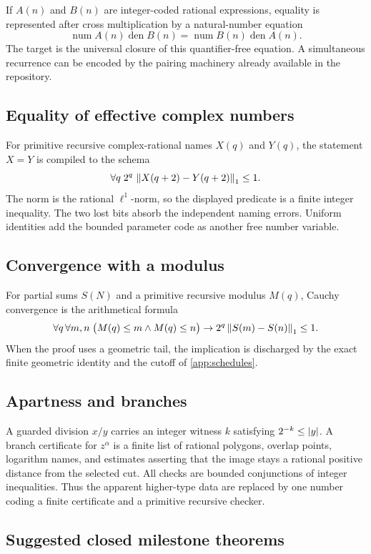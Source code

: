 If \(A(n)\) and \(B(n)\) are integer-coded rational expressions, equality is
represented after cross multiplication by a natural-number equation
\[
 \operatorname{num}A(n)\operatorname{den}B(n)
 =\operatorname{num}B(n)\operatorname{den}A(n).
\]
The target is the universal closure of this quantifier-free equation.  A
simultaneous recurrence can be encoded by the pairing machinery already
available in the repository.

\subsection{Equality of effective complex numbers}

For primitive recursive complex-rational names \(X(q)\) and \(Y(q)\), the
statement \(X=Y\) is compiled to the schema
\[
 \forall q\;
 2^q\,\left\lVert X(q+2)-Y(q+2)\right\rVert_1\le 1.
\]
The norm is the rational \(\ell^1\)-norm, so the displayed predicate is a
finite integer inequality.  The two lost bits absorb the independent naming
errors.  Uniform identities add the bounded parameter code as another free
number variable.

\subsection{Convergence with a modulus}

For partial sums \(S(N)\) and a primitive recursive modulus \(M(q)\), Cauchy
convergence is the arithmetical formula
\[
 \forall q\,\forall m,n\;
 \bigl(M(q)\le m\wedge M(q)\le n\bigr)
 \to 2^q\left\lVert S(m)-S(n)\right\rVert_1\le1.
\]
When the proof uses a geometric tail, the implication is discharged by the
exact finite geometric identity and the cutoff of \cref{app:schedules}.

\subsection{Apartness and branches}

A guarded division \(x/y\) carries an integer witness \(k\) satisfying
\(2^{-k}\le\left|y\right|\).  A branch certificate for \(z^\alpha\) is a finite list
of rational polygons, overlap points, logarithm names, and estimates asserting
that the image stays a rational positive distance from the selected cut.  All
checks are bounded conjunctions of integer inequalities.  Thus the apparent
higher-type data are replaced by one number coding a finite certificate and a
primitive recursive checker.

\subsection{Suggested closed milestone theorems}

